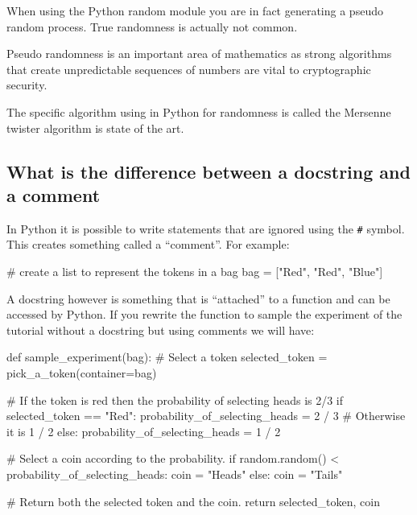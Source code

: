 When using the Python random module you are in fact generating a pseudo random
process. True randomness is actually not common.


Pseudo randomness is an important area of mathematics as strong algorithms that
create unpredictable sequences of numbers are vital to cryptographic security.


The specific algorithm using in Python for randomness is called the Mersenne
twister algorithm is state of the art.


\subsection{What is the difference between a docstring and a comment}
\label{\detokenize{tools-for-mathematics/06-probability/why/main:what-is-the-difference-between-a-docstring-and-a-comment}}\label{\detokenize{tools-for-mathematics/06-probability/why/main:difference-between-a-docstring-and-a-comment}}

In Python it is possible to write statements that are ignored using the \texttt{\#}
symbol. This creates something called a “comment”. For example:




\begin{pyin}
# create a list to represent the tokens in a bag
bag = ["Red", "Red", "Blue"]
\end{pyin}

A docstring however is something that is “attached” to a function and can be
accessed by Python.
If you rewrite the function to sample the experiment of the tutorial without a
docstring but using comments we will have:





\begin{pyin}
def sample_experiment(bag):
    # Select a token
    selected_token = pick_a_token(container=bag)

    # If the token is red then the probability of selecting heads is 2/3
    if selected_token == "Red":
        probability_of_selecting_heads = 2 / 3
    # Otherwise it is 1 / 2
    else:
        probability_of_selecting_heads = 1 / 2

    # Select a coin according to the probability.
    if random.random() < probability_of_selecting_heads:
        coin = "Heads"
    else:
        coin = "Tails"

    # Return both the selected token and the coin.
    return selected_token, coin
\end{pyin}






